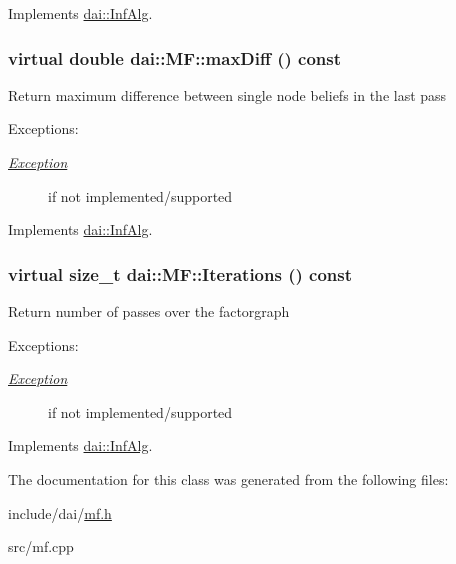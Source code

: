 Implements \hyperlink{classdai_1_1InfAlg_7d006e89e01a2f3e2a40b0f7f6e37ae5}{dai::InfAlg}.\hypertarget{classdai_1_1MF_032b149026f011a5cbcd01eb08a3b8dc}{
\subsubsection[maxDiff]{\setlength{\rightskip}{0pt plus 5cm}virtual double dai::MF::maxDiff () const}}
\label{classdai_1_1MF_032b149026f011a5cbcd01eb08a3b8dc}


Return maximum difference between single node beliefs in the last pass \begin{Desc}
\item[Exceptions:]
\begin{description}
\item[{\em \hyperlink{classdai_1_1Exception}{Exception}}]if not implemented/supported \end{description}
\end{Desc}


Implements \hyperlink{classdai_1_1InfAlg_7e1ca7da15403d5d2af4a855186c0b46}{dai::InfAlg}.\hypertarget{classdai_1_1MF_e2daf3cd007572d19d6156f2484db4fd}{
\subsubsection[Iterations]{\setlength{\rightskip}{0pt plus 5cm}virtual size\_\-t dai::MF::Iterations () const}}
\label{classdai_1_1MF_e2daf3cd007572d19d6156f2484db4fd}


Return number of passes over the factorgraph \begin{Desc}
\item[Exceptions:]
\begin{description}
\item[{\em \hyperlink{classdai_1_1Exception}{Exception}}]if not implemented/supported \end{description}
\end{Desc}


Implements \hyperlink{classdai_1_1InfAlg_7a93807863cc0a2025c1a78bdf1e14b8}{dai::InfAlg}.

The documentation for this class was generated from the following files:\begin{CompactItemize}
\item 
include/dai/\hyperlink{mf_8h}{mf.h}\item 
src/mf.cpp\end{CompactItemize}
